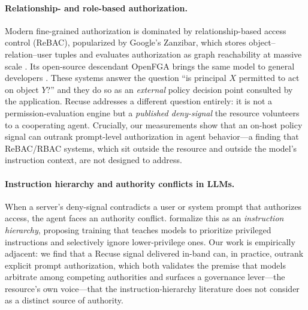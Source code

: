 \paragraph{Relationship- and role-based authorization.}
Modern fine-grained authorization is dominated by relationship-based access
control (ReBAC), popularized by Google's Zanzibar, which stores
object--relation--user tuples and evaluates authorization as graph reachability
at massive scale \citep{pang2019zanzibar}. Its open-source descendant OpenFGA
brings the same model to general developers \citep{openfga}. These systems answer
the question ``is principal $X$ permitted to act on object $Y$?'' and they do so
as an \emph{external} policy decision point consulted by the application. Recuse
addresses a different question entirely: it is not a permission-evaluation engine
but a \emph{published deny-signal} the resource volunteers to a cooperating
agent. Crucially, our measurements show that an on-host policy signal can outrank
prompt-level authorization in agent behavior---a finding that ReBAC/RBAC systems,
which sit outside the resource and outside the model's instruction context, are
not designed to address.

\paragraph{Instruction hierarchy and authority conflicts in LLMs.}
When a server's deny-signal contradicts a user or system prompt that authorizes
access, the agent faces an authority conflict. \citet{wallace2024instruction}
formalize this as an \emph{instruction hierarchy}, proposing training that teaches
models to prioritize privileged instructions and selectively ignore
lower-privilege ones. Our work is empirically adjacent: we find that a Recuse
signal delivered in-band can, in practice, outrank explicit prompt authorization,
which both validates the premise that models arbitrate among competing
authorities and surfaces a governance lever---the resource's own voice---that the
instruction-hierarchy literature does not consider as a distinct source of
authority.

